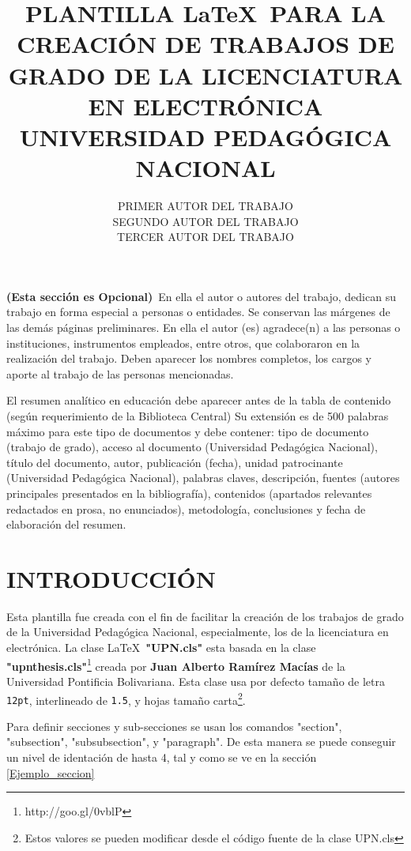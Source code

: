 \documentclass[]{UPN}
\title{PLANTILLA \LaTeX ~PARA LA CREACIÓN DE TRABAJOS DE GRADO DE LA LICENCIATURA EN ELECTRÓNICA UNIVERSIDAD PEDAGÓGICA NACIONAL}
\author{PRIMER AUTOR DEL TRABAJO\\SEGUNDO AUTOR DEL TRABAJO\\TERCER AUTOR DEL TRABAJO}
\begin{document}
\portada
\aprobacion

\begin{agradecimientos}
\textbf{(Esta sección es Opcional)}~En ella el autor o autores del trabajo, dedican su  trabajo en forma especial a personas o entidades. Se 
conservan las márgenes de las demás páginas preliminares. 
En ella el autor (es) agradece(n) a las personas o instituciones, instrumentos empleados, entre otros, que 
colaboraron en la realización del trabajo. Deben aparecer los nombres completos, los cargos y aporte al 
trabajo de las personas mencionadas.
\end{agradecimientos}

\begin{RAE}
El resumen analítico en educación debe aparecer antes de la tabla de contenido (según requerimiento de la 
Biblioteca Central) Su extensión es de 500 palabras máximo para este tipo de documentos y debe contener: 
tipo de documento (trabajo de grado), acceso al documento (Universidad Pedagógica Nacional), título del 
documento, autor, publicación (fecha), unidad patrocinante (Universidad Pedagógica Nacional), palabras
claves, descripción, fuentes (autores principales presentados en la bibliografía), contenidos (apartados 
relevantes redactados en prosa, no enunciados), metodología, conclusiones y fecha de elaboración del 
resumen.
\end{RAE}

\tabladecontenido
\listadefiguras
\listadetablas

\section{INTRODUCCIÓN}
Esta plantilla fue creada con el fin de facilitar la creación de los trabajos de grado de la Universidad Pedagógica Nacional, especialmente, los de la licenciatura en electrónica. La clase \LaTeX~\textbf{"UPN.cls"} esta basada en la clase \textbf{"upnthesis.cls"}\footnote{http://goo.gl/0vblP} creada por \textbf{Juan Alberto Ramírez Macías} de la Universidad Pontificia Bolivariana. Esta clase usa por defecto tamaño de letra {\tt 12pt}, interlineado de {\tt 1.5}, y hojas tamaño carta\footnote{Estos valores se pueden modificar desde el código fuente de la clase UPN.cls}.

Para definir secciones y sub-secciones se usan los comandos "section", "subsection", "subsubsection", y  "paragraph". De esta manera se puede conseguir un nivel de identación de hasta 4, tal y como se ve en la sección \ref{Ejemplo_seccion}
\end{document}
